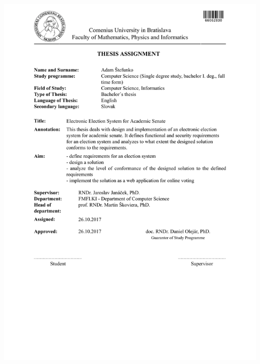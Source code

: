 \documentclass[12pt, oneside]{book}
\begin{document}
\newpage 
\thispagestyle{empty}
\hspace{-4cm}\includegraphics[width=1.3\textwidth]{images/zadanie_ENG}
\end{document}

